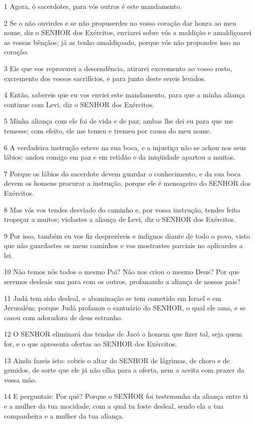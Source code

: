 \par 1 Agora, ó sacerdotes, para vós outros é este mandamento.
\par 2 Se o não ouvirdes e se não propuserdes no vosso coração dar honra ao meu nome, diz o SENHOR dos Exércitos, enviarei sobre vós a maldição e amaldiçoarei as vossas bênçãos; já as tenho amaldiçoado, porque vós não propondes isso no coração.
\par 3 Eis que vos reprovarei a descendência, atirarei excremento ao vosso rosto, excremento dos vossos sacrifícios, e para junto deste sereis levados.
\par 4 Então, sabereis que eu vos enviei este mandamento, para que a minha aliança continue com Levi, diz o SENHOR dos Exércitos.
\par 5 Minha aliança com ele foi de vida e de paz; ambas lhe dei eu para que me temesse; com efeito, ele me temeu e tremeu por causa do meu nome.
\par 6 A verdadeira instrução esteve na sua boca, e a injustiça não se achou nos seus lábios; andou comigo em paz e em retidão e da iniqüidade apartou a muitos.
\par 7 Porque os lábios do sacerdote devem guardar o conhecimento, e da sua boca devem os homens procurar a instrução, porque ele é mensageiro do SENHOR dos Exércitos.
\par 8 Mas vós vos tendes desviado do caminho e, por vossa instrução, tendes feito tropeçar a muitos; violastes a aliança de Levi, diz o SENHOR dos Exércitos.
\par 9 Por isso, também eu vos fiz desprezíveis e indignos diante de todo o povo, visto que não guardastes os meus caminhos e vos mostrastes parciais no aplicardes a lei.
\par 10 Não temos nós todos o mesmo Pai? Não nos criou o mesmo Deus? Por que seremos desleais uns para com os outros, profanando a aliança de nossos pais?
\par 11 Judá tem sido desleal, e abominação se tem cometido em Israel e em Jerusalém; porque Judá profanou o santuário do SENHOR, o qual ele ama, e se casou com adoradora de deus estranho.
\par 12 O SENHOR eliminará das tendas de Jacó o homem que fizer tal, seja quem for, e o que apresenta ofertas ao SENHOR dos Exércitos.
\par 13 Ainda fazeis isto: cobris o altar do SENHOR de lágrimas, de choro e de gemidos, de sorte que ele já não olha para a oferta, nem a aceita com prazer da vossa mão.
\par 14 E perguntais: Por quê? Porque o SENHOR foi testemunha da aliança entre ti e a mulher da tua mocidade, com a qual tu foste desleal, sendo ela a tua companheira e a mulher da tua aliança.
